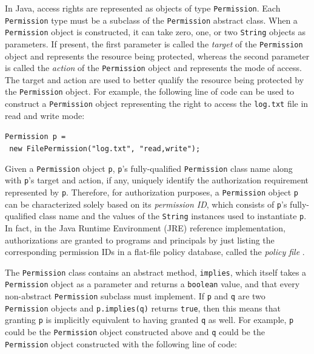In Java, access rights are represented as objects of type
\texttt{Permission}. Each \texttt{Permission} type must be a
subclass of the \texttt{Permission} abstract class.  When a
\texttt{Permission} object is constructed, it can take zero, one,
or two \texttt{String} objects as parameters.  If present, the
first parameter is called the \emph{target} of the
\texttt{Permission} object and represents the resource being
protected, whereas the second parameter is called the
\emph{action} of the \texttt{Permission} object and represents the
mode of access. The target and action are used to better qualify
the resource being protected by the \texttt{Permission} object.
For example, the following line of code can be used to construct a
\texttt{Permission} object representing the right to access the
\texttt{log.txt} file in read and write mode:

\begin{tabbing}
	\texttt{Permission p =}\\
	\texttt{   new FilePermission("log.txt",
		"read,write");}
\end{tabbing}

Given a \texttt{Permission} object \texttt{p}, \texttt{p}'s
fully-qualified \texttt{Permission} class name along with
\texttt{p}'s target and action, if any, uniquely identify the
authorization requirement represented by \texttt{p}. Therefore,
for authorization purposes, a \texttt{Permission} object \texttt{p}
can be characterized solely based on its \textit{permission
	ID}, which consists of \texttt{p}'s fully-qualified class name and
the values of the \texttt{String} instances used to instantiate
\texttt{p}.  In fact, in the Java Runtime Environment (JRE)
reference implementation, authorizations are granted to programs
and principals by just listing the corresponding permission IDs in
a flat-file policy database, called the \emph{policy file}
\cite{book:J2SESecBook}.

The \texttt{Permission} class contains an abstract method,
\texttt{implies}, which itself takes a \texttt{Permission} object
as a parameter and returns a \texttt{boolean} value, and that
every non-abstract \texttt{Permission} subclass must implement. If
\texttt{p} and \texttt{q} are two \texttt{Permission} objects and
\texttt{p.implies(q)} returns \texttt{true}, then this means that
granting \texttt{p} is implicitly equivalent to having granted
\texttt{q} as well.  For example, \texttt{p} could be the
\texttt{Permission} object constructed above and \texttt{q} could
be the \texttt{Permission} object constructed with the following line of
code:

